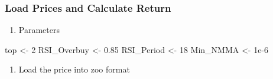 \documentclass[]{article}
\newenvironment{Shaded}{\begin{snugshade}}{\end{snugshade}}
\newcommand{\DataTypeTok}[1]{\textcolor[rgb]{0.13,0.29,0.53}{#1}}
\newcommand{\DecValTok}[1]{\textcolor[rgb]{0.00,0.00,0.81}{#1}}
\newcommand{\FloatTok}[1]{\textcolor[rgb]{0.00,0.00,0.81}{#1}}
\newcommand{\KeywordTok}[1]{\textcolor[rgb]{0.13,0.29,0.53}{\textbf{#1}}}
\newcommand{\NormalTok}[1]{#1}
\newcommand{\OperatorTok}[1]{\textcolor[rgb]{0.81,0.36,0.00}{\textbf{#1}}}
\newcommand{\OtherTok}[1]{\textcolor[rgb]{0.56,0.35,0.01}{#1}}
\newcommand{\StringTok}[1]{\textcolor[rgb]{0.31,0.60,0.02}{#1}}
\providecommand{\tightlist}{%
  \setlength{\itemsep}{0pt}\setlength{\parskip}{0pt}}
\begin{document}
\begin{Shaded}
\end{Shaded}

\hypertarget{load-prices-and-calculate-return}{%
\subsubsection{Load Prices and Calculate
Return}\label{load-prices-and-calculate-return}}

\begin{enumerate}
\def\labelenumi{\arabic{enumi}.}
\setcounter{enumi}{-1}
\tightlist
\item
  Parameters
\end{enumerate}

\begin{Shaded}
\begin{Highlighting}[]
\NormalTok{top <-}\StringTok{ }\DecValTok{2}
\NormalTok{RSI_Overbuy <-}\StringTok{ }\FloatTok{0.85}
\NormalTok{RSI_Period <-}\StringTok{ }\DecValTok{18} 
\NormalTok{Min_NMMA <-}\StringTok{ }\FloatTok{1e-6}
\end{Highlighting}
\end{Shaded}

\begin{enumerate}
\def\labelenumi{\arabic{enumi}.}
\tightlist
\item
  Load the price into zoo format
\end{enumerate}
\end{document}
